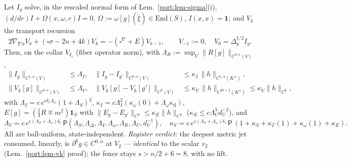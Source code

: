 \begin{lemma}\label{dspin:lem-rec}
Let $I_g$ solve, in the rescaled normal form of Lem.~\ref{port:lem-sigma}(i),
$(d/dr)I+\Omega(x,\omega,r)I=0$, $\Omega:=\omega[g](\dot\xi)\in\mathrm{End}(S)$,
$I(x,x)=\mathbf 1$; and $V_k$ the transport recursion
\begin{equation}\label{dspin:eq-rec}
  2\nabla_{\nabla\sigma}V_k+(\square\sigma-2n+4k)V_k=-(\square^\nabla+E)V_{k-1},
  \qquad V_{-1}:=0,\quad V_0=\Delta^{1/2}_g I_g.
\end{equation}
Then, on the collar $V_{\delta_c}$ (fiber operator norm), with
$\Lambda_R:=\sup_U\|R[g]\|_{C^{0,\alpha}(V)}$,
\begin{align}
  \|I_g\|_{C^{1,\alpha}(V)}&\le\Lambda_I,& \|I_g-I_{g'}\|_{C^{0,\alpha}(V)}
  &\le\kappa_I\,\|h\|_{C^{1,\alpha}(K'')},\label{dspin:eq-Ibnd}\\
  \|V_k[g]\|_{C^{0,\alpha}(V)}&\le\Lambda_V,& \|V_k[g]-V_k[g']\|_{C^0(V)}
  &\le\kappa_V\,\|h\|_{C^{2k+2}(K'')}\le\kappa_V\|h\|_{C^6},\label{dspin:eq-Vbnd}
\end{align}
with $\Lambda_I=c\,e^{c\delta_c\Lambda_\omega}(1+\Lambda_S)^2$,
$\kappa_I=c\Lambda_I^2(\kappa_\omega(0)+\Lambda_\omega\kappa_{\mathrm{fl}})$,
$E[g]=(\tfrac14R\mp m^2)\mathbf 1_S$ with $\|E_g-E_{g'}\|_{C^0}\le\kappa_E
\|h\|_{C^2}$ ($\kappa_E\le c\Lambda_U^3 d_U^{-2}$), and
\[
  \Lambda_V=c\,e^{c(\Lambda_S+\Lambda_\omega)\delta_c}\,
  \mathsf P(\Lambda_S,\Lambda_\Delta,\Lambda_I,\Lambda_\omega,\Lambda_R,
  \Lambda_U,d_U^{-1}),\quad
  \kappa_V=c\,e^{c(\Lambda_S+\Lambda_\omega)\delta_c}\,\mathsf P\,
  (1+\kappa_S+\kappa_\Gamma(1)+\kappa_\omega(1)+\kappa_E).
\]
All are ball-uniform, state-independent. \emph{Register verdict:} the deepest
metric jet consumed, linearly, is $\partial^6 g\in C^{0,\alpha}$ at $V_2$ ---
\emph{identical} to the scalar $v_2$ (Lem.~\ref{port:lem-vk} proof); the fence
stays $s>n/2+6=8$, with no lift.
\end{lemma}
